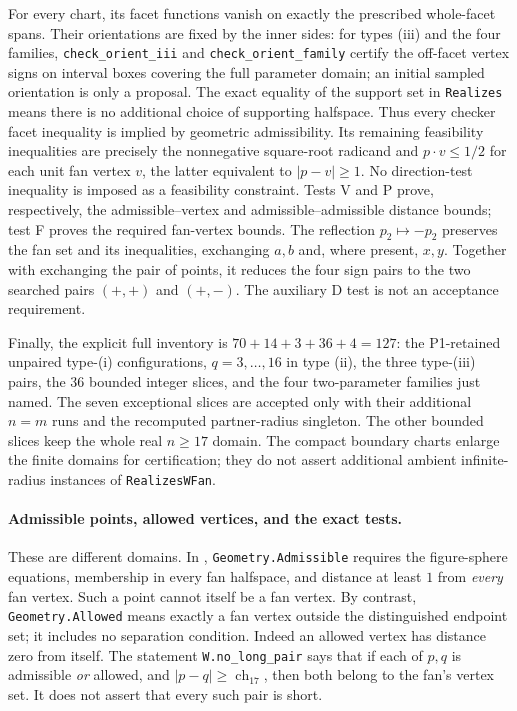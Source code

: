 \documentclass[11pt]{article}
\theoremstyle{definition}
\theoremstyle{remark}
\newcommand{\ch}{\operatorname{ch}}
\newcommand{\file}[1]{\path{#1}}
\begin{document}
For every chart, its facet functions vanish on exactly the prescribed
whole-facet spans. Their orientations are fixed by the inner sides:
for types (iii) and the four families, \texttt{check\_orient\_iii} and
\texttt{check\_orient\_family} certify the off-facet vertex signs on
interval boxes covering the full parameter domain; an initial sampled
orientation is only a proposal. The exact equality of the support set
in \texttt{Realizes} means there is no additional choice of supporting
halfspace. Thus every checker facet inequality is implied by geometric
admissibility. Its remaining feasibility inequalities are precisely the
nonnegative square-root radicand and
$p\cdot v\le1/2$ for each unit fan vertex $v$, the latter equivalent
to $|p-v|\ge1$. No direction-test inequality is imposed as a feasibility
constraint. Tests V and P prove, respectively, the admissible--vertex
and admissible--admissible distance bounds; test F proves the required
fan-vertex bounds. The reflection $p_2\mapsto-p_2$ preserves the fan
set and its inequalities, exchanging $a,b$ and, where present, $x,y$.
Together with exchanging the pair of points, it reduces the four sign
pairs to the two searched pairs $(+,+)$ and $(+,-)$.
The auxiliary D test is not an acceptance requirement.

Finally, the explicit full inventory is
$70+14+3+36+4=127$: the P1-retained unpaired type-(i) configurations,
$q=3,\ldots,16$ in type (ii), the three type-(iii) pairs, the 36 bounded
integer slices, and the four two-parameter families just named.
The seven exceptional slices are accepted only with their additional
$n=m$ runs and the recomputed partner-radius singleton. The other
bounded slices keep the whole real $n\ge17$ domain. The compact boundary
charts enlarge the finite domains for certification; they do not assert
additional ambient infinite-radius instances of \texttt{RealizesWFan}.

\paragraph{Admissible points, allowed vertices, and the exact tests.}
These are different domains. In
\file{lean/Uniform5/CompositionWedgeInput.lean},
\texttt{Geometry.Admissible} requires the figure-sphere equations,
membership in every fan halfspace, and distance at least $1$ from
\emph{every} fan vertex. Such a point cannot itself be a fan vertex.
By contrast, \texttt{Geometry.Allowed} means exactly a fan vertex outside
the distinguished endpoint set; it includes no separation condition.
Indeed an allowed vertex has distance zero from itself. The statement
\texttt{W.no\_long\_pair} says that if each of $p,q$ is admissible
\emph{or} allowed, and $|p-q|\ge\ch_{17}$, then both belong to the fan's
vertex set. It does not assert that every such pair is short.
\end{document}
